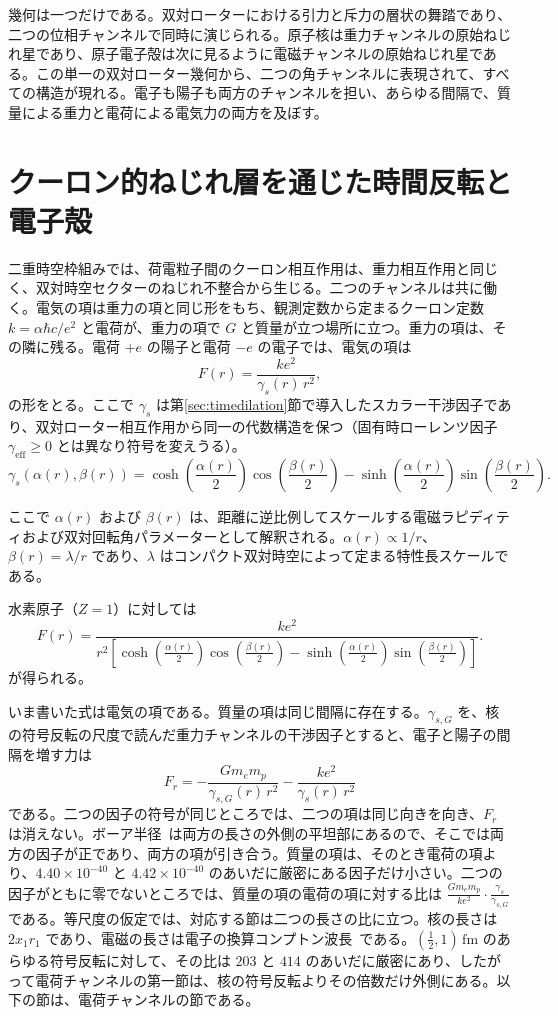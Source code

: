 \documentclass[a4paper]{article}
\begin{document}
幾何は一つだけである。双対ローターにおける引力と斥力の層状の舞踏であり、二つの位相チャンネルで同時に演じられる。原子核は重力チャンネルの原始ねじれ星であり、原子電子殻は次に見るように電磁チャンネルの原始ねじれ星である。この単一の双対ローター幾何から、二つの角チャンネルに表現されて、すべての構造が現れる。電子も陽子も両方のチャンネルを担い、あらゆる間隔で、質量による重力と電荷による電気力の両方を及ぼす。

\section{クーロン的ねじれ層を通じた時間反転と電子殻}
\label{sec:electronshells}

二重時空枠組みでは、荷電粒子間のクーロン相互作用は、重力相互作用と同じく、双対時空セクターのねじれ不整合から生じる。二つのチャンネルは共に働く。電気の項は重力の項と同じ形をもち、観測定数から定まるクーロン定数 \(k=\alpha\hbar c/e^{2}\) と電荷が、重力の項で \(G\) と質量が立つ場所に立つ。重力の項は、その隣に残る。電荷 \(+e\) の陽子と電荷 \(-e\) の電子では、電気の項は
\[
F(r) = \frac{k e^2}{\gamma_s(r)\, r^2},
\]
の形をとる。ここで \(\gamma_s\) は第\ref{sec:timedilation}節で導入したスカラー干渉因子であり、双対ローター相互作用から同一の代数構造を保つ（固有時ローレンツ因子 \(\gamma_\text{eff} \geq 0\) とは異なり符号を変えうる）。
\[
\gamma_s(\alpha(r),\beta(r)) = \cosh\!\left(\frac{\alpha(r)}{2}\right) \cos\!\left(\frac{\beta(r)}{2}\right) - \sinh\!\left(\frac{\alpha(r)}{2}\right) \sin\!\left(\frac{\beta(r)}{2}\right).
\]

ここで \(\alpha(r)\) および \(\beta(r)\) は、距離に逆比例してスケールする電磁ラピディティおよび双対回転角パラメーターとして解釈される。\(\alpha(r) \propto 1/r\)、\(\beta(r) = \lambda / r\) であり、\(\lambda\) はコンパクト双対時空によって定まる特性長スケールである。

水素原子（\(Z=1\)）に対しては
\[
F(r) = \frac{k e^2}{r^2 \left[ \cosh\!\left(\frac{\alpha(r)}{2}\right) \cos\!\left(\frac{\beta(r)}{2}\right) - \sinh\!\left(\frac{\alpha(r)}{2}\right) \sin\!\left(\frac{\beta(r)}{2}\right) \right]}.
\]
が得られる。

いま書いた式は電気の項である。質量の項は同じ間隔に存在する。\(\gamma_{s,G}\) を、核の符号反転の尺度で読んだ重力チャンネルの干渉因子とすると、電子と陽子の間隔を増す力は
\[
F_r
  =-\frac{G m_e m_p}{\gamma_{s,G}(r)\,r^{2}}
  -\frac{k e^{2}}{\gamma_s(r)\,r^{2}}
\]
である。二つの因子の符号が同じところでは、二つの項は同じ向きを向き、\(F_r\) は消えない。ボーア半径~\cite{bohr1913}は両方の長さの外側の平坦部にあるので、そこでは両方の因子が正であり、両方の項が引き合う。質量の項は、そのとき電荷の項より、\(4.40\times 10^{-40}\) と \(4.42\times 10^{-40}\) のあいだに厳密にある因子だけ小さい。二つの因子がともに零でないところでは、質量の項の電荷の項に対する比は \(\frac{G m_e m_p}{k e^{2}}\cdot\frac{\gamma_s}{\gamma_{s,G}}\) である。等尺度の仮定では、対応する節は二つの長さの比に立つ。核の長さは \(2x_1 r_1\) であり、電磁の長さは電子の換算コンプトン波長~\cite{compton1923}である。\((\tfrac12,1)\,\mathrm{fm}\) のあらゆる符号反転に対して、その比は \(203\) と \(414\) のあいだに厳密にあり、したがって電荷チャンネルの第一節は、核の符号反転よりその倍数だけ外側にある。以下の節は、電荷チャンネルの節である。
\end{document}
